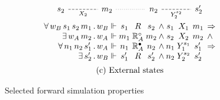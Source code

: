 \documentclass[sigplan,screen]{acmart}
\begin{document}
\begin{figure}
\[\begin{array}{c}
\begin{tikzcd}[sep=large,baseline=-3pt]
        s_2 \ar[r, "X_2"', dash, dashed] &
        m_2 \ar[r, dotted, dash] &
        n_2 \ar[r, "Y_2^{s_2}"', dash, dashed] &
        s_2'
      \end{tikzcd}
      \vspace{0.5ex} \\
      \begin{array}{
          r @{\,.\,} l @{{} \Vdash {}} c@{}c@{}c @{\:\wedge\:}
                                    c@{}c@{}c @{\:\:} l}
        \forall \, w_B \, s_1 \, s_2 \, m_1 & w_B & s_1 & {}\mathrel{R}{} & s_2 &
                        s_1 & {}\mathrel{X_1}{} & m_1 & \Rightarrow \\
        \exists \, w_A \, m_2 & w_A & m_1 & {}\mathrel{\mathbb{R}_A^\que}{} & m_2 &
                        s_2 & {}\mathrel{X_2}{} & m_2 & \wedge \\
        \forall \, n_1 \, n_2 \, s_1' & w_A & n_1 & {}\mathrel{\mathbb{R}_A^\ans}{} & n_2 &
                        n_1 & {}\mathrel{Y_1^{s_1}}{} & s_1' & \Rightarrow \\
        \exists \, s_2' & w_B & s_1' & {}\mathrel{R}{} & s_2' &
                        n_2 & {}\mathrel{Y_2^{s_2}}{} & s_2' &
      \end{array}
      \vspace{1.2ex} \\
      \text{(c) External states}
    \end{array}
  \]
  \caption{Selected forward simulation properties}
  \label{fig:fsim}
\end{figure}
\end{document}
